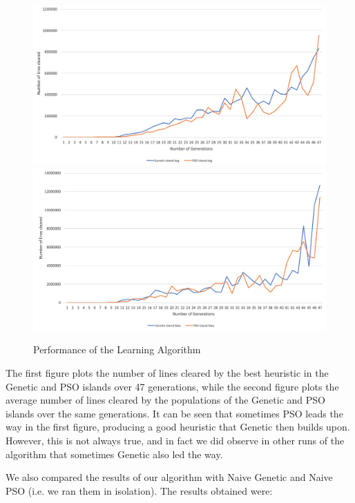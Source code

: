 \documentclass{article}
\begin{document}
\begin{figure}[h]
	\includegraphics[scale=0.28]{learning/AlgoMax}
	\includegraphics[scale=0.28]{learning/AlgoAvg}
	\centering
	\caption{Performance of the Learning Algorithm}
	\label{fig:learning}
\end{figure}

The first figure plots the number of lines cleared by the best heuristic in the
Genetic and PSO islands over 47 generations, while the second figure plots the
average number of lines cleared by the populations of the Genetic and PSO
islands over the same generations. It can be seen that sometimes PSO leads the
way in the first figure, producing a good heuristic that Genetic then builds
upon. However, this is not always true, and in fact we did observe in other
runs of the algorithm that sometimes Genetic also led the way.

We also compared the results of our algorithm with Naive Genetic and Naive PSO
(i.e. we ran them in isolation). The results obtained were:
\end{document}
